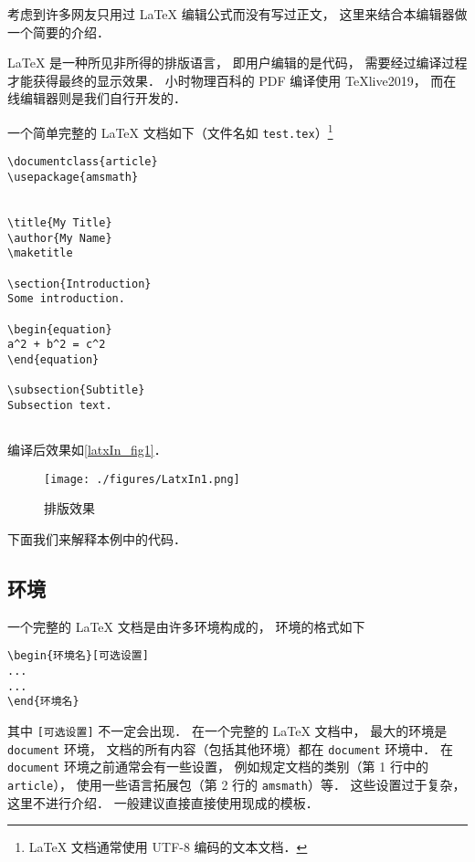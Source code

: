 
考虑到许多网友只用过 LaTeX 编辑公式而没有写过正文， 这里来结合本编辑器做一个简要的介绍．

LaTeX 是一种所见非所得的排版语言， 即用户编辑的是代码， 需要经过编译过程才能获得最终的显示效果． 小时物理百科的 PDF 编译使用 TeXlive2019， 而在线编辑器则是我们自行开发的．

一个简单完整的 LaTeX 文档如下（文件名如 \lstinline|test.tex|）\footnote{LaTeX 文档通常使用 UTF-8 编码的文本文档．}
\begin{lstlisting}
\documentclass{article}
\usepackage{amsmath}


\title{My Title}
\author{My Name}
\maketitle

\section{Introduction}
Some introduction.

\begin{equation}
a^2 + b^2 = c^2
\end{equation}

\subsection{Subtitle}
Subsection text.


\end{lstlisting}

编译后效果如\autoref{latxIn_fig1}．
\begin{figure}[ht]
\centering
\texttt{[image: ./figures/LatxIn1.png]}
\caption{排版效果} \label{latxIn_fig1}
\end{figure}
下面我们来解释本例中的代码．

\subsection{环境}
一个完整的 LaTeX 文档是由许多环境构成的， 环境的格式如下
\begin{lstlisting}
\begin{环境名}[可选设置]
...
...
\end{环境名}
\end{lstlisting}
其中 \lstinline|[可选设置]| 不一定会出现． 在一个完整的 LaTeX 文档中， 最大的环境是 \lstinline|document| 环境， 文档的所有内容（包括其他环境）都在 \lstinline|document| 环境中． 在 \lstinline|document| 环境之前通常会有一些设置， 例如规定文档的类别（第 1 行中的 \lstinline|article|）， 使用一些语言拓展包（第 2 行的 \lstinline|amsmath|）等． 这些设置过于复杂， 这里不进行介绍． 一般建议直接直接使用现成的模板．

